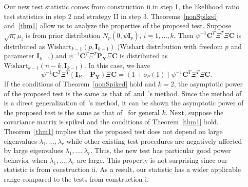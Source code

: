 \documentclass[12pt]{article} %
\DeclareMathOperator{\mytr}{tr}
\DeclareMathOperator{\myE}{E}
\newcommand{\bX}{\mathbf{X}}
\newcommand{\bP}{\mathbf{P}}
\newcommand{\bY}{\mathbf{Y}}
\newcommand{\bC}{\mathbf{C}}
\newcommand{\bI}{\mathbf{I}}
\theoremstyle{definition}
\begin{document}
Our new test statistic comes from construction ii in step 1, the likelihood ratio test statistics in step 2 and strategy II in step 3.
Theorems~\ref{nonSpiked} and~\ref{thm1} allow us to analyze the properties of the proposed test.
Suppose $\sqrt{n_i}\mu_i$ is from prior distribution $N_p(0,\psi \bI_p)$, $i=1,\ldots, k$.
Then $\psi^{-1}\bC^T \Xi^T \Xi \bC$ is distributed as $\text{Wishart}_{k-1}(p,\bI_{k-1})$ (Wishart distribution with freedom $p$ and parameter $\bI_{k-1}$) and $\psi^{-1}\bC^T \Xi^T \bP_{\bY}\Xi \bC$ is distributed as $\text{Wishart}_{k-1}(n-k,\bI_{k-1})$.
In this case, we have
$$
\psi^{-1}\bC^T \Xi^T (\bI_P-\bP_{\bY})\Xi \bC=
(1+o_P(1))\psi^{-1}\bC^T \Xi^T \Xi \bC.
$$
If the conditions of Theorem~\ref{nonSpiked} hold and $k=2$, the asymptotic power of the proposed test is the same as that of~\cite{Bai1996Efiect}and~\cite{Chen2010A}'s method.
Since the method of~\cite{Schott2007Some} is a direct generalization of~\cite{Bai1996Efiect}'s method, it can be shown the asymptotic power of the proposed test is the same as that of~\cite{Schott2007Some} for general $k$.
Next, suppose the covariance matrix is spiked and the conditions of Theorem~\ref{thm1} hold.
Theorem~\ref{thm1} implies that the proposed test does not depend on large eigenvalues $\lambda_1,\ldots,\lambda_r$ while other existing test procedures are negatively affected by large eigenvalues $\lambda_1,\ldots,\lambda_r$.   
Thus, the new test has particular good power behavior when $\lambda_1,\ldots,\lambda_r$ are large.
 This property is not surprising since our statistic is from construction ii.
As a result, our statistic has a wider applicable range compared to the tests from construction i.


%

\end{document}
